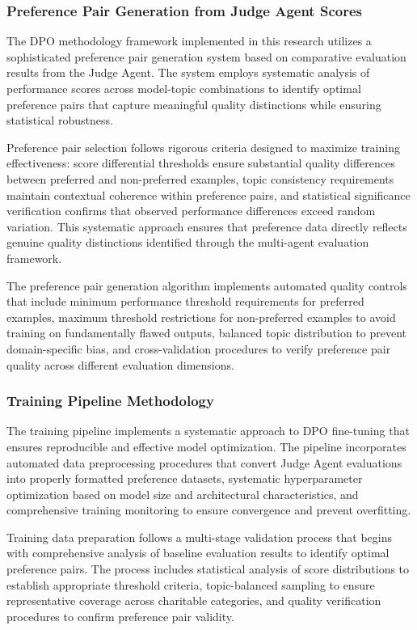 \subsubsection{Preference Pair Generation from Judge Agent Scores}

The DPO methodology framework implemented in this research utilizes a sophisticated preference pair generation system based on comparative evaluation results from the Judge Agent. The system employs systematic analysis of performance scores across model-topic combinations to identify optimal preference pairs that capture meaningful quality distinctions while ensuring statistical robustness.

Preference pair selection follows rigorous criteria designed to maximize training effectiveness: score differential thresholds ensure substantial quality differences between preferred and non-preferred examples, topic consistency requirements maintain contextual coherence within preference pairs, and statistical significance verification confirms that observed performance differences exceed random variation. This systematic approach ensures that preference data directly reflects genuine quality distinctions identified through the multi-agent evaluation framework.

The preference pair generation algorithm implements automated quality controls that include minimum performance threshold requirements for preferred examples, maximum threshold restrictions for non-preferred examples to avoid training on fundamentally flawed outputs, balanced topic distribution to prevent domain-specific bias, and cross-validation procedures to verify preference pair quality across different evaluation dimensions.

\subsubsection{Training Pipeline Methodology}

The training pipeline implements a systematic approach to DPO fine-tuning that ensures reproducible and effective model optimization. The pipeline incorporates automated data preprocessing procedures that convert Judge Agent evaluations into properly formatted preference datasets, systematic hyperparameter optimization based on model size and architectural characteristics, and comprehensive training monitoring to ensure convergence and prevent overfitting.

Training data preparation follows a multi-stage validation process that begins with comprehensive analysis of baseline evaluation results to identify optimal preference pairs. The process includes statistical analysis of score distributions to establish appropriate threshold criteria, topic-balanced sampling to ensure representative coverage across charitable categories, and quality verification procedures to confirm preference pair validity.


